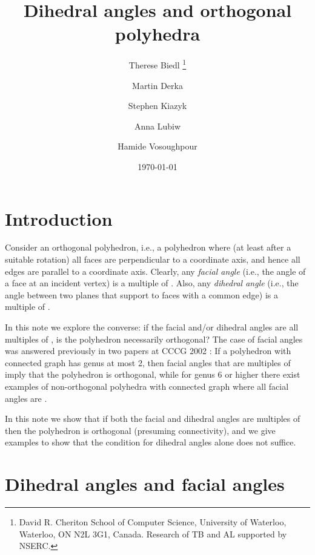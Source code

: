 \documentclass[12pt]{article}
\begin{document}
\title{Dihedral angles and orthogonal polyhedra}
\author{Therese Biedl 
\thanks{David R. Cheriton School of Computer Science, University of Waterloo, 
Waterloo, ON N2L 3G1, Canada.
Research of TB and AL supported by NSERC.}
\and Martin Derka 
\addtocounter{footnote}{-1}\footnotemark
\and Stephen Kiazyk 
\addtocounter{footnote}{-1}\footnotemark
\and
Anna Lubiw 
\addtocounter{footnote}{-1}\footnotemark
\and Hamide Vosoughpour
\addtocounter{footnote}{-1}\footnotemark
}
\date{\today}

\maketitle

\section{Introduction}

Consider an orthogonal polyhedron, i.e., a polyhedron where (at
least after a suitable rotation) all faces are perpendicular to a coordinate
axis, and hence all edges are parallel to a coordinate axis.  Clearly,
any {\em facial angle} (i.e., the angle of a face at an incident vertex)
is a multiple of .  Also, any {\em dihedral angle} (i.e., the
angle between two planes that support to faces with a common edge) is
a multiple of .

In this note we explore the converse: if the facial and/or dihedral angles are all multiples 
of , is the polyhedron necessarily orthogonal?  
The case of facial angles was answered previously 
in two papers at CCCG 2002 
\cite{DO-CCCG02,BCD+-CCCG02}: If a polyhedron with connected graph
has genus at most 2,
then facial angles that are multiples of  imply that the
polyhedron is orthogonal, while for genus 6 or higher there exist
examples of non-orthogonal polyhedra with connected graph
where all facial angles are .  

In this note we show that if both the facial and dihedral angles are multiples of  
then the polyhedron is orthogonal (presuming connectivity), 
and we give examples to show that the condition for dihedral 
angles alone does not suffice.

\section{Dihedral angles and facial angles}
\end{document}
